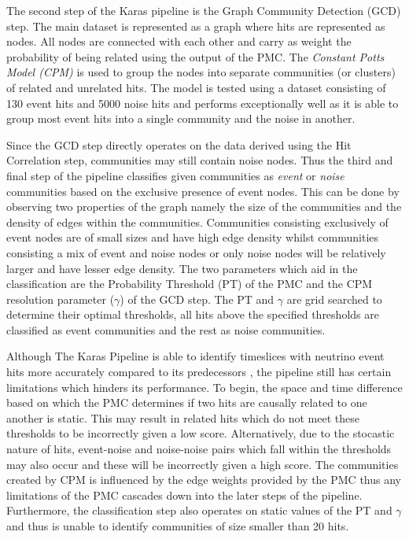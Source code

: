 The second step of the Karas pipeline is the Graph Community Detection
(GCD) step. The main dataset is represented as a graph where hits are
represented as nodes. All nodes are connected with each other and
carry as weight the probability of being related using the output of
the PMC. The \emph{Constant Potts Model (CPM)} \cite{traag2011narrow}
is used to group the nodes into separate communities (or clusters) of
related and unrelated hits. The model is tested using a dataset
consisting of 130 event hits and 5000 noise hits and performs
exceptionally well as it is able to group most event hits into a
single community and the noise in another.

Since the GCD step directly operates on the data derived using the Hit
Correlation step, communities may still contain noise nodes. Thus the
third and final step of the pipeline classifies given communities as
\emph{event} or \emph{noise} communities based on the exclusive
presence of event nodes. This can be done by observing two properties
of the graph namely the size of the communities and the density of
edges within the communities. Communities consisting exclusively of
event nodes are of small sizes and have high edge density whilst
communities consisting a mix of event and noise nodes or only noise
nodes will be relatively larger and have lesser edge density. The two
parameters which aid in the classification are the Probability
Threshold (PT) of the PMC and the CPM resolution parameter ($\gamma$)
of the GCD step. The PT and $\gamma$ are grid searched to determine
their optimal thresholds, all hits above the specified thresholds are
classified as event communities and the rest as noise communities.

Although The Karas Pipeline is able to identify timeslices with
neutrino event hits more accurately compared to its predecessors
\cite{karas2019data}, the pipeline still has certain limitations which
hinders its performance. To begin, the space and time difference based
on which the PMC determines if two hits are causally related to one
another is static. This may result in related hits which do not meet
these thresholds to be incorrectly given a low score. Alternatively,
due to the stocastic nature of hits, event-noise and noise-noise pairs
which fall within the thresholds may also occur and these will be
incorrectly given a high score. The communities created by CPM is
influenced by the edge weights provided by the PMC thus any
limitations of the PMC cascades down into the later steps of the
pipeline. Furthermore, the classification step also operates on static
values of the PT and $\gamma$ and thus is unable to identify
communities of size smaller than 20 hits.

